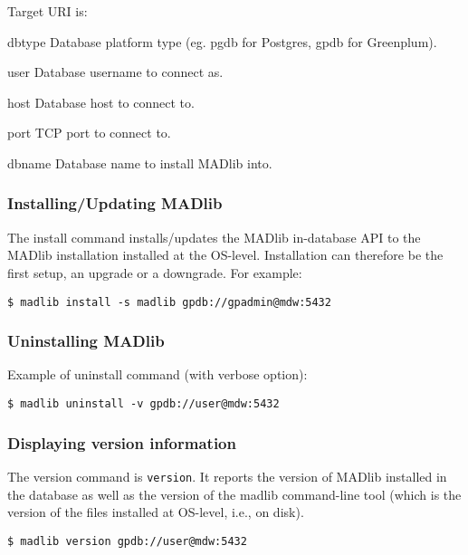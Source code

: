 \documentclass[11pt]{article}
\begin{document}
{\begin{description}
	\item Target URI is: 
	\begin{ttdescription}
		\item[dbtype] Database platform type (eg. pgdb for Postgres, gpdb for Greenplum). 
		\item[user] Database username to connect as.
		\item[host] Database host to connect to.
		\item[port] TCP port to connect to.
		\item[dbname] Database name to install MADlib into.
	\end{ttdescription}
	
\end{description}

	\subsubsection{Installing/Updating MADlib}

		The install command installs/updates the MADlib in-database API to the MADlib installation installed at the OS-level. Installation can therefore be the first setup, an upgrade or a downgrade. For example:

		\begin{lstlisting}
$ madlib install -s madlib gpdb://gpadmin@mdw:5432
		\end{lstlisting}

	\subsubsection{Uninstalling MADlib}

		Example of uninstall command (with verbose option):

		\begin{lstlisting}
$ madlib uninstall -v gpdb://user@mdw:5432
		\end{lstlisting}

	\subsubsection{Displaying version information}

		The version command is \texttt{version}. It reports the version of MADlib installed in the database as well as the version of the madlib command-line tool (which is the version of the files installed at OS-level, i.e., on disk).

		\begin{lstlisting}
$ madlib version gpdb://user@mdw:5432
		\end{lstlisting}
		
}
\end{document}

